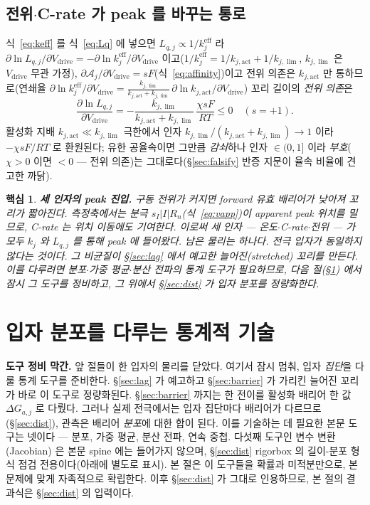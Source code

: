 \documentclass[11pt,a4paper]{article}
\newtheorem*{keybox}{핵심}
\newcommand{\eff}{\mathrm{eff}}
\newcommand{\drive}{\mathrm{drive}}
\begin{document}
\subsection{전위$\cdot$C-rate 가 peak 를 바꾸는 통로}
식~\eqref{eq:keff} 를 식~\eqref{eq:Lq} 에 넣으면 $L_{q,j}\propto1/k_j^{\eff}$ 라 $\partial\ln L_{q,j}/\partial V_\drive=-\partial\ln k_j^{\eff}/\partial V_\drive$ 이고($1/k_j^{\eff}=1/k_{j,\mathrm{act}}+1/k_{j,\lim}$,
$k_{j,\lim}$ 은 $V_\drive$ 무관 가정), $\partial\mathcal A_j/\partial V_\drive=sF$(식~\eqref{eq:affinity})이고 전위 의존은
$k_{j,\mathrm{act}}$ 만 통하므로(연쇄율 $\partial\ln k_j^{\eff}/\partial V_\drive=\tfrac{k_{j,\lim}}{k_{j,\mathrm{act}}+k_{j,\lim}}\,\partial\ln k_{j,\mathrm{act}}/\partial V_\drive$)
꼬리 길이의 \emph{전위 의존}은
\begin{equation}
\frac{\partial\ln L_{q,j}}{\partial V_\drive}=-\frac{k_{j,\lim}}{k_{j,\mathrm{act}}+k_{j,\lim}}\,\frac{\chi sF}{RT}\le0\quad(s=+1).
\label{eq:LqV}
\end{equation}
활성화 지배 $k_{j,\mathrm{act}}\ll k_{j,\lim}$ 극한에서 인자 $k_{j,\lim}/(k_{j,\mathrm{act}}+k_{j,\lim})\to1$ 이라 $-\chi sF/RT$ 로
환원된다; 유한 공율속이면 그만큼 \emph{감쇠}하나 인자 $\in(0,1]$ 이라 \emph{부호}($\chi>0$ 이면 $<0$ — 전위 의존)는
그대로다(\S\ref{sec:falsify} 반증 지문이 율속 비율에 견고한 까닭).
\begin{keybox}
\textbf{세 인자의 peak 진입.} 구동 전위가 커지면 forward 유효 배리어가 낮아져 꼬리가 짧아진다. 측정축에서는
분극 $s_I|I|R_n$(식~\eqref{eq:vapp})이 apparent peak 위치를 밀므로, C-rate 는 위치 이동에도 기여한다. 이로써
세 인자 — 온도$\cdot$C-rate$\cdot$전위 — 가 모두 $k_j$ 와 $L_{q,j}$ 를 통해 peak 에 들어왔다. 남은 물리는
하나다. 전극 입자가 동일하지 않다는 것이다. 그 비균질이 \S\ref{sec:lag} 에서 예고한 늘어진(stretched) 꼬리를
만든다. 이를 다루려면 분포$\cdot$가중 평균$\cdot$분산 전파의 통계 도구가 필요하므로, 다음 절(\S\ref{sec:stattools})
에서 잠시 그 도구를 정비하고, 그 위에서 \S\ref{sec:dist} 가 입자 분포를 정량화한다.
\end{keybox}

\section{입자 분포를 다루는 통계적 기술}\label{sec:stattools}
\textbf{도구 정비 막간.} 앞 절들이 한 입자의 물리를 닫았다. 여기서 잠시 멈춰, 입자 \emph{집단}을 다룰 통계
도구를 준비한다. \S\ref{sec:lag} 가 예고하고 \S\ref{sec:barrier} 가 가리킨 늘어진 꼬리가 바로 이 도구로
정량화된다. \S\ref{sec:barrier} 까지는 한 전이를 활성화 배리어 한 값 $\Delta G_{a,j}$ 로 다뤘다. 그러나 실제
전극에서는 입자 집단마다 배리어가 다르므로(\S\ref{sec:dist}), 관측은 배리어 \emph{분포}에 대한 합이 된다. 이를
기술하는 데 필요한 본문 도구는 넷이다 — 분포, 가중 평균, 분산 전파, 연속 중첩. 다섯째 도구인 변수 변환(Jacobian)
은 본문 spine 에는 들어가지 않으며, \S\ref{sec:dist} rigorbox 의 길이-분포 형식 점검 전용이다(아래에 별도로
표시). 본 절은 이 도구들을 확률과 미적분만으로, 본 문제에 맞게 자족적으로 확립한다. 이후 \S\ref{sec:dist} 가
그대로 인용하므로, 본 절의 결과식은 \S\ref{sec:dist} 의 입력이다.
\end{document}
